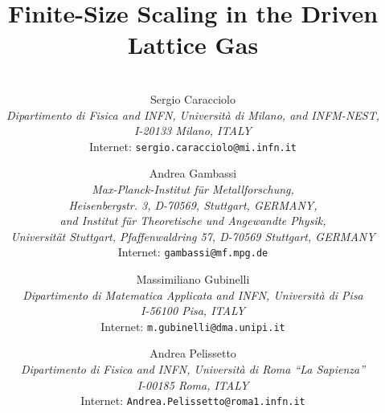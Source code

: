 \documentclass[12pt]{article}
\begin{document}
\title{Finite-Size Scaling in 
the Driven Lattice Gas
}
\date{}
\author{
  \\
  { Sergio Caracciolo}              \\
  {\small\it Dipartimento di Fisica and INFN, Universit\`a di Milano, 
    and INFM-NEST, }  \\[-0.2cm]
  {\small\it I-20133 Milano, ITALY}          \\[-0.2cm]
  {\small Internet: {\tt sergio.caracciolo@mi.infn.it}}   
  \\[-0.1cm]  \and
  { Andrea Gambassi }              \\
  {\small\it Max-Planck-Institut f\"ur Metallforschung,}  \\[-0.2cm]
  {\small\it Heisenbergstr. 3, D-70569, Stuttgart, GERMANY,}      \\[-0.2cm]
  {\small\it and Institut f\"ur Theoretische und Angewandte Physik,} \\[-0.2cm]
  {\small\it Universit\"at Stuttgart, Pfaffenwaldring 57, 
       D-70569 Stuttgart, GERMANY} \\[-0.2cm]
  {\small Internet: {\tt gambassi@mf.mpg.de}}   
  \\[-0.1cm]  \and
  { Massimiliano Gubinelli}              \\
  {\small\it Dipartimento di Matematica Applicata  and INFN,
       Universit\`a di Pisa} \\[-0.2cm]
  {\small\it I-56100 Pisa, ITALY}          \\[-0.2cm]
  {\small Internet: {\tt m.gubinelli@dma.unipi.it}}   
  \\[-0.1cm]  \and
  { Andrea Pelissetto}              \\
  {\small\it Dipartimento di Fisica and INFN,
           Universit\`a di Roma ``La Sapienza''}        \\[-0.2cm]
  {\small\it I-00185 Roma, ITALY}          \\[-0.2cm]
  {\small Internet: {\tt Andrea.Pelissetto@roma1.infn.it}}   \\[-0.2cm]
  {\protect\makebox[5in]{\quad}}  %
  \\
}
\vspace{0.5cm}



\newcommand{\be}{\begin{equation}}
\newcommand{\<}{\langle}
\renewcommand{\>}{\rangle}
\newcommand{\R}[2]{$(#2,#1)$}
\def\spose#1{\hbox to 0pt{#1\hss}}
\def\ltapprox{\mathrel{\spose{\lower 3pt\hbox{$\mathchar"218$}}
 \raise 2.0pt\hbox{$\mathchar"13C$}}}
\def\gtapprox{\mathrel{\spose{\lower 3pt\hbox{$\mathchar"218$}}
 \raise 2.0pt\hbox{$\mathchar"13E$}}}
\end{document}
